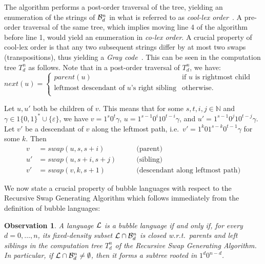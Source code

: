 \documentclass[11pt,a4paper]{llncs}
\def\swap{\textit{swap}}
\def\IN{{\mathbb N}}
\renewcommand{\epsilon}{\varepsilon}
\newtheorem{observation}{Observation}
\begin{document}
The algorithm performs a post-order traversal of the tree, yielding an enumeration of the strings of ${\cal B}_d^n$ in what is referred to as {\em cool-lex order}~\cite{Wi09,SW12,RSW12}. A pre-order traversal of the same tree, which implies moving line 4 of the algorithm before line 1, would yield an enumeration in {\em co-lex order}. A crucial property of cool-lex order is that any two subsequent strings differ by at most two swaps (transpositions), thus yielding a {\em Gray code}~\cite{RSW12}. 
This can be seen in the computation tree $T_d^n$ as follows. Note that in a post-order traversal of $T_d^n$, we have:\\

$next(u) = 
\begin{cases}
parent(u) & \text{if } u \text{ is rightmost child}\\
\text{leftmost descendant of $u$'s right sibling} & \text{otherwise.}\\
\end{cases}
$

\medskip


Let $u,u'$ both be children of $v$. This means that for some $s,t,i,j\in \IN$ and $\gamma\in 1\{0,1\}^* \cup \{\epsilon\}$, we have $v=1^s0^t\gamma$,  $u=1^{s-1}0^{i}10^{t-i}\gamma$, and $u'=1^{s-1}0^{j}10^{t-j}\gamma$. Let $v'$ be a  descendant of $v$ along the leftmost path, i.e.\ $v' = 1^k01^{s-k}0^{t-1}\gamma$ for some $k$. Then
\begin{align}\label{eq:swap}
v &= \swap(u,s,s+i) & \qquad \text{(parent)}\\
u' &= \swap(u,s+i,s+j) & \qquad \text{(sibling)} \nonumber\\
v' &= \swap(v,k,s+1) & \qquad \text{(descendant along leftmost path)}\nonumber
\end{align}


\medskip 

We now state a crucial property of bubble languages with respect to the Recursive Swap Generating Algorithm which follows immediately from the definition of bubble languages: 


\begin{observation}\label{obs:tree}
A language ${\cal L}$ is a bubble language if and only if, for every $d=0,\ldots,n$, its fixed-density subset ${\cal L}\cap {\mathcal B}_d^n$ is closed w.r.t.\ parents and left siblings in the computation tree $T_d^n$ of the Recursive Swap Generating Algorithm. In particular, if ${\cal L}\cap {\mathcal B}_d^n \neq \emptyset$, then it forms a subtree rooted in $1^d0^{n-d}$.
\end{observation}
\end{document}
